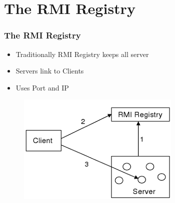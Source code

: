 \documentclass{beamer}
\begin{document}
\section{The RMI Registry}
	\begin{frame}
		\frametitle{The RMI Registry}
		
		\begin{itemize}
		\item Traditionally RMI Registry keeps all server
		\item Servers link to Clients
		\item Uses Port and IP
		\end{itemize}
		
		\begin{figure}[H]
			\begin{minipage}[b]{0.5\linewidth}
			\centering
			\includegraphics[width=\linewidth]{RMI-registry}
			\end{minipage}			
			\hspace{0.5cm}
			\begin{minipage}[b]{0.4\linewidth}
			\centering

\end{minipage}
\end{figure}
\end{frame}
\end{document}
